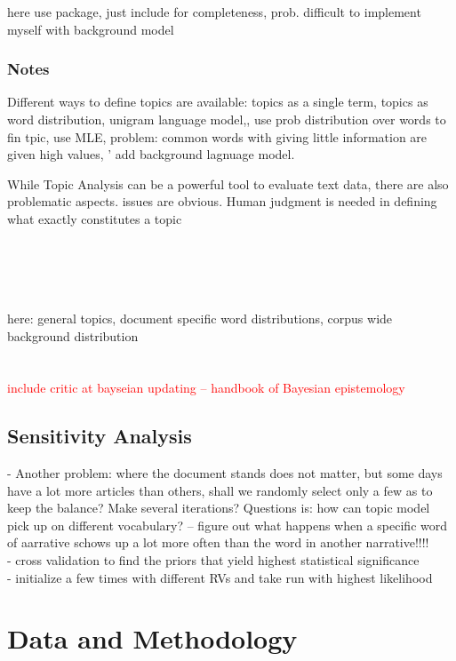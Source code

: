 \documentclass[11pt,a4paper,english,oneside]{book}
\numberwithin{equation}{chapter}
\begin{document}
here use package, just include for completeness, prob. difficult to implement myself with background model




\subsection{Notes}


Different ways to define topics are available: topics as a single term, topics as word distribution,
unigram language model,, use prob distribution over words to fin tpic, use MLE, problem: common words with giving little information are given high values, ' add background lagnuage model.  

While Topic Analysis can be a powerful tool to evaluate text data, there are also problematic aspects. issues are obvious. Human judgment is needed in defining what exactly constitutes a topic

\cite{Hoffman2010} \\
\cite{Steyvers(2007)}\\
\cite{Blei.2003}\\
\cite{Asuncion.2009}\\
here:  general topics, document specific word distributions, corpus wide background distribution \cite{Chem.2007}\\
\cite{Bishop.2006}\\
\cite{Darling.2011}\\

\textcolor{red}{include critic at bayseian updating -- handbook of Bayesian epistemology}


\section{Sensitivity Analysis}

- Another problem: where the document stands does not matter, but some days have a lot more articles than others, shall we randomly select only a few as to keep the balance? Make several iterations? Questions is: how can topic model pick up on different vocabulary? -- figure out what happens when a specific word of aarrative schows up a lot more often than the word in another narrative!!!!\\
- cross validation to find the priors that yield highest statistical significance\\
- initialize a few times with different RVs and take run with highest likelihood


\chapter{Data and Methodology}
\end{document}
